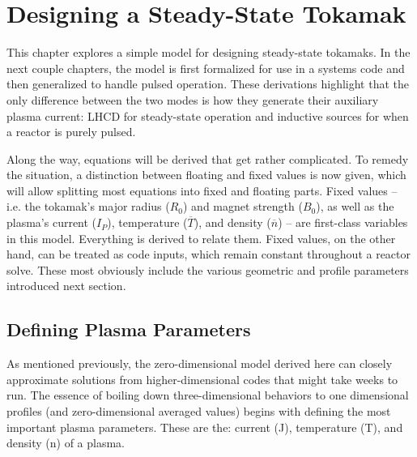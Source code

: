 %
%
%
%
%
%
%
%

\chapter{Designing a Steady-State Tokamak}

This chapter explores a simple model for designing steady-state tokamaks. In the next couple chapters, the model is first formalized for use in a systems code and then generalized to handle pulsed operation. These derivations highlight that the only difference between the two modes is how they generate their auxiliary plasma current: LHCD for steady-state operation and inductive sources for when a reactor is purely pulsed.

Along the way, equations will be derived that get rather complicated. To remedy the situation, a distinction between floating and fixed values is now given, which will allow splitting most equations into fixed and floating parts. Fixed values -- i.e. the tokamak's major radius ($R_0$) and magnet strength ($B_0$), as well as the plasma's current ($I_P$), temperature ($\overline T$), and density ($\overline n$) -- are first-class variables in this model. Everything is derived to relate them. Fixed values, on the other hand, can be treated as code inputs, which remain constant throughout a reactor solve.  These most obviously include the various geometric and profile parameters introduced next section. 

\section{Defining Plasma Parameters}

As mentioned previously, the zero-dimensional model derived here can closely approximate solutions from higher-dimensional codes that might take weeks to run. The essence of boiling down three-dimensional behaviors to one dimensional profiles (and zero-dimensional averaged values) begins with defining the most important plasma parameters. These are the: current (J), temperature (T), and density (n) of a plasma.

